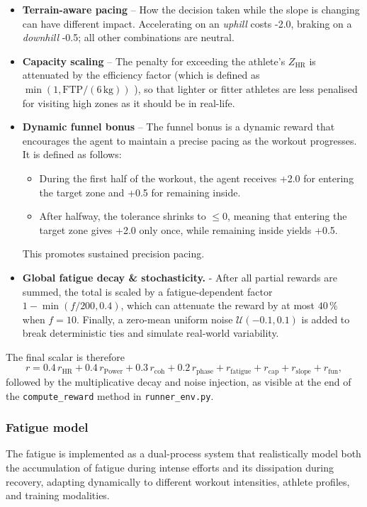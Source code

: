 \begin{itemize}
  \item \textbf{Terrain-aware pacing} – How the decision taken while the slope is changing can have different impact. Accelerating on an
        \emph{uphill} costs -2.0, braking on a \emph{downhill} -0.5; all other combinations are neutral.

  \item \textbf{Capacity scaling} –  The penalty for exceeding the athlete's \(Z_{\text{HR}}\) is attenuated by the efficiency factor (which is defined as \(\min(1,\text{FTP}/(6\,\text{kg}))\) ), so that lighter or fitter athletes are less penalised for visiting high zones as it should be in real-life.
  
  \item \textbf{Dynamic funnel bonus} – The funnel bonus is a dynamic reward that encourages the agent to maintain a precise pacing as the workout progresses.  It is defined as follows:
        \begin{itemize}
          \item During the first half of the workout, the agent receives +2.0 for entering the target zone and +0.5 for remaining inside.
          \item After halfway, the tolerance shrinks to \(\le 0\), meaning that entering the target zone gives +2.0 only once, while remaining inside yields +0.5.
        \end{itemize}
        This promotes sustained precision pacing.

  \item \textbf{Global fatigue decay \& stochasticity.} -  After all partial rewards are summed, the total is scaled by a fatigue-dependent factor \(1-\min(f/200,0.4)\), which can attenuate the reward by at most \(40\,\%\) when \(f\!=\!10\).  
  Finally, a zero-mean uniform noise \(\mathcal{U}(-0.1,0.1)\) is added to break deterministic ties and simulate real-world variability. 

\end{itemize}

The final scalar is therefore
\[
r = 0.4\,r_{\text{HR}} + 0.4\,r_{\text{Power}}
     + 0.3\,r_{\mathrm{coh}} + 0.2\,r_{\mathrm{phase}}
     + r_{\mathrm{fatigue}} + r_{\mathrm{cap}}
     + r_{\mathrm{slope}} + r_{\mathrm{fun}},
\]
followed by the multiplicative decay and noise injection, as visible at the end of the \texttt{compute\_reward} method in \texttt{runner\_env.py}.


\subsubsection{Fatigue model}\label{subsubsec:fatigue}
The fatigue is implemented as a dual-process system that realistically model both the accumulation of fatigue during intense efforts and its dissipation during recovery, adapting dynamically to different workout intensities, athlete profiles, and training modalities. 

